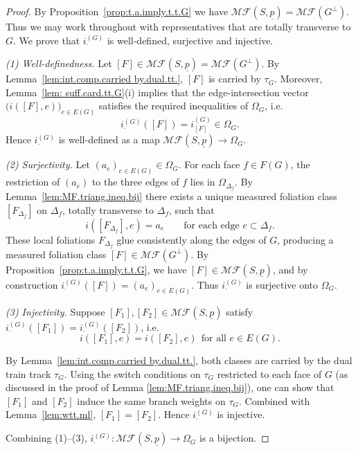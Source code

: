 \documentclass[11pt, letterpaper]{amsart}
\theoremstyle{definition}
\theoremstyle{remark}
\newcommand{\up}{\underline{p}}
\newcommand{\iG}{i^{(G)}}
\newcommand{\cMF}{\mathcal{MF}}
\newcommand{\cMFp}{\mathcal{MF} (S,\up)}
\numberwithin{equation}{section}
\begin{document}
\begin{proof}
By Proposition~\ref{prop:t.a.imply.t.t.G} we have \(\cMFp=\cMF(G^{\perp})\).
Thus we may work throughout with representatives that are totally transverse to \(G\).
We prove that \(\iG_{\cdot}\) is well-defined, surjective and injective.



\emph{(1) Well-definedness.}
Let \([F]\in\cMFp=\cMF(G^\perp)\).
By Lemma~\ref{lem:int.comp.carried by.dual.tt.}, \([F]\) is carried by \(\tau_G\).
Moreover, Lemma~\ref{lem: suff.card.tt.G}(i) implies that the edge-intersection vector
\(
\big(i([F],e)\big)_{e\in E(G)}
\)
satisfies the required inequalities of \(\Omega_G\), i.e.
\[
\iG_{\cdot}([F]) = i^{(G)}_{[F]} \in \Omega_G.
\]
Hence \(\iG_{\cdot}\) is well-defined as a map \(\cMFp\to\Omega_G\).



\emph{(2) Surjectivity.}
Let \((a_e)_{e\in E(G)}\in\Omega_G\).
For each face \(f\in F(G)\), the restriction of \((a_e)\) to the three edges of \(f\) lies in \(\Omega_{\Delta_f}\).
By Lemma~\ref{lem:MF.triang.ineq.bij} there exists a unique measured foliation class \([F_{\Delta_f}]\) on \(\Delta_f\), totally transverse to \(\Delta_f\), such that
\[
i([F_{\Delta_f}],e)=a_e \qquad\text{for each edge } e\subset \Delta_f.
\]
These local foliations \(F_{\Delta_f}\) glue consistently along the edges of \(G\), producing a measured foliation class
\(
[F]\in \cMF(G^\perp).
\)
By Proposition~\ref{prop:t.a.imply.t.t.G}, we have \([F]\in\cMFp\), and by construction
\(\iG_{\cdot}([F])=(a_e)_{e\in E(G)}\).
Thus \(\iG_{\cdot}\) is surjective onto \(\Omega_G\).



\emph{(3) Injectivity.}
Suppose \([F_1],[F_2]\in\cMFp\) satisfy
\(\iG_{\cdot}([F_1])=\iG_{\cdot}([F_2])\), i.e.
\[
i([F_1],e)=i([F_2],e)\ \ \text{for all } e\in E(G).
\]


By Lemma~\ref{lem:int.comp.carried by.dual.tt.}, both classes are carried by the dual train track \(\tau_G\). Using the switch conditions on $\tau_G$ restricted to each face of $G$ (as discussed in the proof of Lemma \ref{lem:MF.triang.ineq.bij}), one can show that \([F_1]\) and \([F_2]\) induce the same branch weights on $\tau_G$. Combined with Lemma~\ref{lem:wtt.ml}, \([F_1]=[F_2]\).
Hence \(\iG_{\cdot}\) is injective.

Combining (1)--(3), \(\iG_{\cdot}:\cMFp\to\Omega_G\) is a bijection.


\end{proof}
\end{document}

